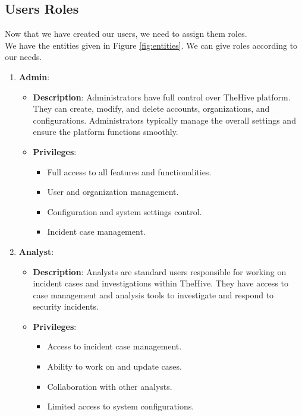 \documentclass{article}
\begin{document}
\subsection{Users Roles}
Now that we have created our users, we need to assign them roles.\\
We have the entities given in Figure \ref{fig:entities}. We can give roles according to our needs.\\
\begin{enumerate}
    \item \textbf{Admin}:
       \begin{itemize}
         \item \textbf{Description}: Administrators have full control over TheHive platform. They can create, modify, and delete accounts, organizations, and configurations. Administrators typically manage the overall settings and ensure the platform functions smoothly.
         \item \textbf{Privileges}:
         \begin{itemize}
           \item Full access to all features and functionalities.
           \item User and organization management.
           \item Configuration and system settings control.
           \item Incident case management.
         \end{itemize}
       \end{itemize}
  
    \item \textbf{Analyst}:
       \begin{itemize}
         \item \textbf{Description}: Analysts are standard users responsible for working on incident cases and investigations within TheHive. They have access to case management and analysis tools to investigate and respond to security incidents.
         \item \textbf{Privileges}:
         \begin{itemize}
           \item Access to incident case management.
           \item Ability to work on and update cases.
           \item Collaboration with other analysts.
           \item Limited access to system configurations.
         \end{itemize}
       \end{itemize}
  

\end{enumerate}
\end{document}
